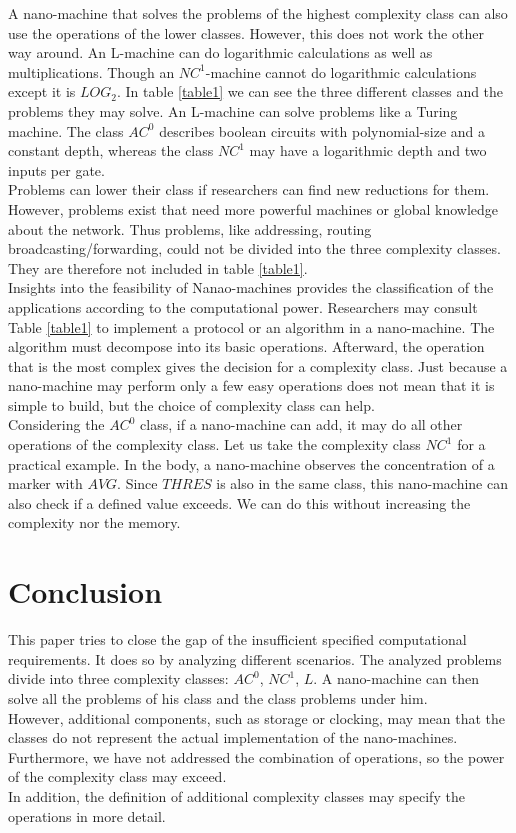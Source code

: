 \documentclass[10pt,sigconf]{acmart}
\begin{document}
A nano-machine that solves the problems of the highest complexity class can also use the operations of the lower classes.
However, this does not work the other way around.
An L-machine can do logarithmic calculations as well as multiplications.
Though an $NC^1$-machine cannot do logarithmic calculations except it is $LOG_2$.  
In table \ref{table1} we can see the three different classes and the problems they may solve.
An L-machine can solve problems like a Turing machine.
The class $AC^0$ describes boolean circuits with polynomial-size and a constant depth, whereas the class $NC^1$ may have a logarithmic depth and two inputs per gate.\\ 
Problems can lower their class if researchers can find new reductions for them. 
However, problems exist that need more powerful machines or global knowledge about the network.
Thus problems, like addressing, routing broadcasting/forwarding, could not be divided into the three complexity classes.
They are therefore not included in table \ref{table1}.\\
Insights into the feasibility of Nanao-machines provides the classification of the applications according to the computational power. 
Researchers may consult Table \ref{table1} to implement a protocol or an algorithm in a nano-machine. 
The algorithm must decompose into its basic operations. Afterward, the operation that is the most complex gives the decision for a complexity class.
Just because a nano-machine may perform only a few easy operations does not mean that it is simple to build, but the choice of complexity class can help.\\
Considering the $AC^0$ class, if a nano-machine can add, it may do all other operations of the complexity class.
Let us take the complexity class $NC^1$ for a practical example. In the body, a nano-machine observes the concentration of a marker with $AVG$.
Since $THRES$ is also in the same class, this nano-machine can also check if a defined value exceeds. We can do this without increasing the complexity nor the memory.





\section{Conclusion}
This paper tries to close the gap of the insufficient specified computational requirements.
It does so by analyzing different scenarios. 
The analyzed problems divide into three complexity classes: $AC^0$, $NC^1$, $L$.
A nano-machine can then solve all the problems of his class and the class problems under him.\\
However, additional components, such as storage or clocking, may mean that the classes do not represent the actual implementation of the nano-machines.\\
Furthermore, we have not addressed the combination of operations, so the power of the complexity class may exceed.\\
In addition, the definition of additional complexity classes may specify the operations in more detail.








 
\end{document}

